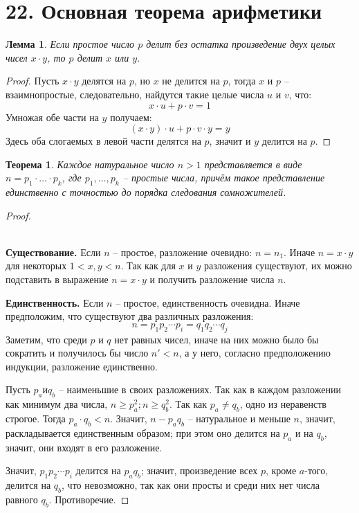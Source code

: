 \documentclass[a4paper,12pt]{article}
\newtheorem*{Lemma}{Лемма}
\newtheorem*{theorem}{Теорема}
\begin{document}
    \section*{22. Основная теорема арифметики}
        \begin{Lemma}
            Если простое число $p$ делит без остатка произведение двух целых чисел $x \cdot y$, то $p$ делит $x$ или $y$.
        \end{Lemma}
        \begin{proof}
            Пусть $x \cdot y$ делятся на $p$, но $x$ не делится на $p$, тогда $x$ и $p$ -- взаимнопростые, следовательно, найдутся такие целые числа $u$ и $v$, что:
            \[
                x\cdot u + p \cdot v = 1
            \]
            Умножая обе части на $y$ получаем:
            \[
                (x\cdot y) \cdot u  + p \cdot v \cdot y = y
            \]
            Здесь оба слогаемых в левой части делятся на $p$, значит и $y$ делится на $p$. 
        \end{proof}
        \begin{theorem}
            Каждое натуральное число $n >1 $ представляется в виде $n=p_1\cdot\ldots\cdot p_k$, где $p_1,\ldots,p_k$ -- простые числа, причём такое представление единственно с точностью до порядка следования сомножителей.
        \end{theorem}
        \begin{proof}\ \\
        \ 
        
        \textbf{Существование.} Если $n$ -- простое, разложение очевидно: $n = n_{1}$. Иначе $n = x \cdot y$ для некоторых $1 < x,y < n$. Так как для $x$ и $y$ разложения существуют, их можно подставить в выражение $n = x \cdot y$ и получить разложение числа $n$.


        \textbf{Единственность.} Если $n$ -- простое, единственность очевидна. Иначе предположим, что существуют два различных разложения:
        \[
            n = p_{1}p_{2} \cdots p_{i} = q_{1}q_{2} \cdots q_{j}
        \]
        Заметим, что среди $p$ и $q$ нет равных чисел, иначе на них можно было бы сократить и получилось бы число $n' < n$, а у него, согласно предположению индукции, разложение единственно.
        
        Пусть $p_{a} и q_{b}$ -- наименьшие в своих разложениях. Так как в каждом разложении как минимум два числа, $n \geqslant p^{2}_{a}; n \geqslant q_{b}^{2}$. Так как $p_{a} \ne q_{b}$, одно из неравенств строгое. Тогда $p_{a} \cdot q_{b} < n$. Значит, $n - p_{a}q_{b}$ -- натуральное и меньше $n$, значит, раскладывается единственным образом; при этом оно делится на $p_{a}$ и на $q_{b}$, значит, они входят в его разложение.
        
        Значит, $p_{1}p_{2} \cdots p_{i}$ делится на $p_{a}q_{b}$; значит, произведение всех $p$, кроме $a$-того, делится на $q_{b}$, что невозможно, так как они просты и среди них нет числа равного $q_{b}$. Противоречие.
        \end{proof}
\end{document}
